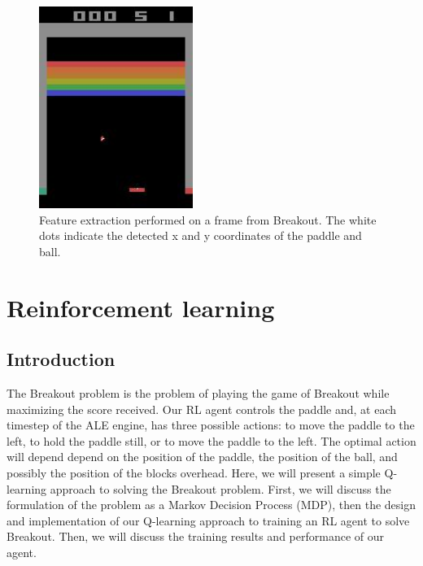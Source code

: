 \documentclass{article}
\begin{document}
\begin{figure}[H]
  \centering
  \includegraphics[width=50mm]{tmp2.jpg}
  \caption{Feature extraction performed on a frame from Breakout.  The white dots indicate the detected x and y coordinates of the paddle and ball.}
  \label{breakout:fe}
\end{figure}

\section{Reinforcement learning}
\subsection{Introduction}
The Breakout problem is the problem of playing the game of Breakout while maximizing the score received.  Our RL agent controls the paddle and, at each timestep of the ALE engine, has three possible actions: to move the paddle to the left, to hold the paddle still, or to move the paddle to the left.  The optimal action will depend depend on the position of the paddle, the position of the ball, and possibly the position of the blocks overhead.  Here, we will present a simple Q-learning approach to solving the Breakout problem.  First, we will discuss the formulation of the problem as a Markov Decision Process (MDP), then the design and implementation of our Q-learning approach to training an RL agent to solve Breakout.  Then, we will discuss the training results and performance of our agent.
\end{document}
